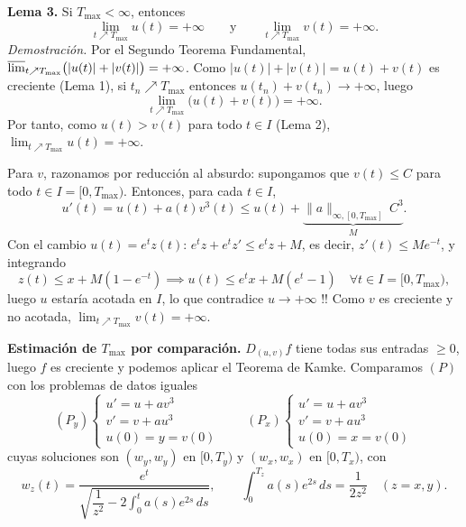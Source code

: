 {    \textbf{Lema 3.} Si $T_{\max} < \infty$, entonces
    \[
        \lim_{t \nearrow T_{\max}} u(t) = +\infty \qquad \text{y} \qquad \lim_{t \nearrow T_{\max}} v(t) = +\infty.
    \]
    \textit{Demostración.} Por el Segundo Teorema Fundamental, $\varlimsup_{t \nearrow T_{\max}} \bigl( |u(t)| + |v(t)| \bigr) = +\infty$. Como $|u(t)| + |v(t)| = u(t) + v(t)$ es creciente (Lema 1), si $t_n \nearrow T_{\max}$ entonces $u(t_n) + v(t_n) \to +\infty$, luego
    \[
        \lim_{t \nearrow T_{\max}} \bigl( u(t) + v(t) \bigr) = +\infty.
    \]
    Por tanto, como $u(t) > v(t)$ para todo $t \in I$ (Lema 2), $\lim_{t \nearrow T_{\max}} u(t) = +\infty$.

    Para $v$, razonamos por reducción al absurdo: supongamos que $v(t) \leq C$ para todo $t \in I = [0, T_{\max})$. Entonces, para cada $t \in I$,
    \[
        u'(t) = u(t) + a(t) v^3(t) \leq u(t) + \underbrace{\| a \|_{\infty, [0, T_{\max}]} \, C^3}_{M}.
    \]
    Con el cambio $u(t) = e^t z(t)$: $e^t z + e^t z' \leq e^t z + M$, es decir, $z'(t) \leq M e^{-t}$, y integrando
    \[
        z(t) \leq x + M (1 - e^{-t}) \implies u(t) \leq e^t x + M (e^t - 1) \quad \forall t \in I = [0, T_{\max}),
    \]
    luego $u$ estaría acotada en $I$, lo que contradice $u \to +\infty$ !! Como $v$ es creciente y no acotada, $\lim_{t \nearrow T_{\max}} v(t) = +\infty$.
    \begin{center}
    \end{center}

    \textbf{Estimación de $T_{\max}$ por comparación.} $D_{(u,v)} f$ tiene todas sus entradas $\geq 0$, luego $f$ es creciente y podemos aplicar el Teorema de Kamke. Comparamos $(P)$ con los problemas de datos iguales
    \[
        (P_y) \begin{cases} u' = u + a v^3 \\ v' = v + a u^3 \\ u(0) = y = v(0) \end{cases}
        \qquad
        (P_x) \begin{cases} u' = u + a v^3 \\ v' = v + a u^3 \\ u(0) = x = v(0) \end{cases}
    \]
    cuyas soluciones son $(w_y, w_y)$ en $[0, T_y)$ y $(w_x, w_x)$ en $[0, T_x)$, con
    \[
        w_z(t) = \frac{e^t}{\sqrt{\dfrac{1}{z^2} - 2 \displaystyle\int_0^t a(s) e^{2s} \, ds}}, \qquad \int_0^{T_z} a(s) e^{2s} \, ds = \frac{1}{2 z^2} \quad (z = x, y).
    \]

}
